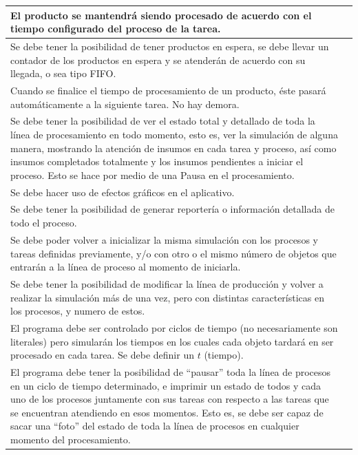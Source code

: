 \documentclass[12pt,letterpaper]{article}
\newcommand{\cmark}{\textcolor{checkgreen}{\ding{51}}}
\begin{document}
\begin{longtable}{|p{13cm}|C{1.5cm}|}
\hline
El producto se mantendrá siendo procesado de acuerdo con el tiempo configurado del proceso de la tarea. & \cmark \\
\hline
Se debe tener la posibilidad de tener productos en espera, se debe llevar un contador de los productos en espera y se atenderán de acuerdo con su llegada, o sea tipo FIFO. & \cmark \\
\hline
Cuando se finalice el tiempo de procesamiento de un producto, éste pasará automáticamente a la siguiente tarea. No hay demora. & \cmark \\
\hline
Se debe tener la posibilidad de ver el estado total y detallado de toda la línea de procesamiento en todo momento, esto es, ver la simulación de alguna manera, mostrando la atención de insumos en cada tarea y proceso, así como insumos completados totalmente y los insumos pendientes a iniciar el proceso. Esto se hace por medio de una Pausa en el procesamiento. & \cmark \\
\hline
Se debe hacer uso de efectos gráficos en el aplicativo. & \cmark \\
\hline
Se debe tener la posibilidad de generar reportería o información detallada de todo el proceso. & \cmark \\
\hline
Se debe poder volver a inicializar la misma simulación con los procesos y tareas definidas previamente, y/o con otro o el mismo número de objetos que entrarán a la línea de proceso al momento de iniciarla. & \cmark \\
\hline
Se debe tener la posibilidad de modificar la línea de producción y volver a realizar la simulación más de una vez, pero con distintas características en los procesos, y numero de estos. & \cmark \\
\hline
El programa debe ser controlado por ciclos de tiempo (no necesariamente son literales) pero simularán los tiempos en los cuales cada objeto tardará en ser procesado en cada tarea. Se debe definir un $t$ (tiempo). & \cmark \\
\hline
El programa debe tener la posibilidad de ``pausar'' toda la línea de procesos en un ciclo de tiempo determinado, e imprimir un estado de todos y cada uno de los procesos juntamente con sus tareas con respecto a las tareas que se encuentran atendiendo en esos momentos. Esto es, se debe ser capaz de sacar una ``foto'' del estado de toda la línea de procesos en cualquier momento del procesamiento. & \cmark \\
\hline
\end{longtable}
\end{document}
